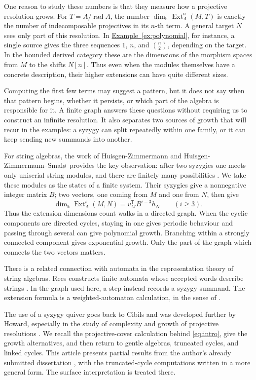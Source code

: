 \documentclass[reqno]{amsart}
\numberwithin{equation}{section}
\theoremstyle{definition}
\theoremstyle{remark}
\DeclareMathOperator{\Ext}{Ext}
\DeclareMathOperator{\rad}{rad}
\newcommand{\transpose}{^{\mathsf T}}
\newcommand{\kk}{\Bbbk}
\newcommand{\kdim}{\dim_{\kk}}
\newcommand{\exref}[1]{\hyperref[#1]{Example~\ref*{#1}}}
\begin{document}
One reason to study these numbers is that they measure how a projective resolution grows. For \(T=A/\rad A\), the number \(\kdim\Ext_A^n(M,T)\) is exactly the number of indecomposable projectives in its \(n\)-th term. A general target \(N\) sees only part of this resolution. In \exref{ex:polynomial}, for instance, a single source gives the three sequences \(1\), \(n\), and \(\binom n2\), depending on the target. In the bounded derived category these are the dimensions of the morphism spaces from \(M\) to the shifts \(N[n]\). Thus even when the modules themselves have a concrete description, their higher extensions can have quite different sizes.

Computing the first few terms may suggest a pattern, but it does not say when that pattern begins, whether it persists, or which part of the algebra is responsible for it. A finite graph answers these questions without requiring us to construct an infinite resolution. It also separates two sources of growth that will recur in the examples: a syzygy can split repeatedly within one family, or it can keep sending new summands into another.

For string algebras, the work of Huisgen-Zimmermann and Huisgen-Zimmermann--Smal\o\ provides the key observation: after two syzygies one meets only uniserial string modules, and there are finitely many possibilities \cite{HZ,HZS}. We take these modules as the states of a finite system. Their syzygies give a nonnegative integer matrix \(B\); two vectors, one coming from \(M\) and one from \(N\), then give
\begin{equation}\label{eq:intro}
 \kdim\Ext_A^i(M,N)=v_M\transpose B^{i-3}h_N\qquad (i\ge3).
\end{equation}
Thus the extension dimensions count walks in a directed graph. When the cyclic components are directed cycles, staying in one gives periodic behaviour and passing through several can give polynomial growth. Branching within a strongly connected component gives exponential growth. Only the part of the graph which connects the two vectors matters.

There is a related connection with automata in the representation theory of string algebras. Rees constructs finite automata whose accepted words describe strings \cite{Rees08}. In the graph used here, a step instead records a syzygy summand. The extension formula is a weighted-automaton calculation, in the sense of \cite[\S1.6]{BerstelReutenauer11}.

The use of a syzygy quiver goes back to Cibils and was developed further by Howard, especially in the study of complexity and growth of projective resolutions \cite{Cibils93,Howard10,Howard15}. We recall the projective-cover calculation behind \eqref{eq:intro}, give the growth alternatives, and then return to gentle algebras, truncated cycles, and linked cycles. This article presents partial results from the author's already submitted dissertation \cite{IrunguDissertation}, with the truncated-cycle computations written in a more general form. The surface interpretation is treated there.
\end{document}
